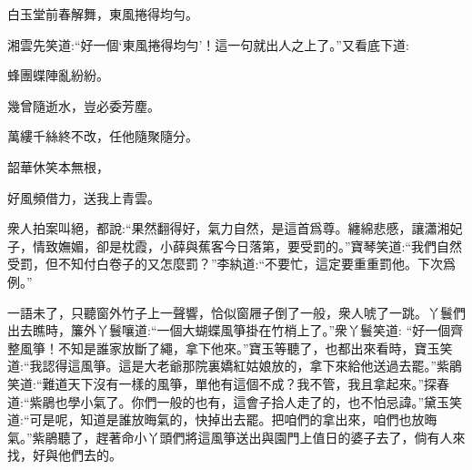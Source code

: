 \begin{poem}
    \begin{pl}白玉堂前春解舞，東風捲得均勻。\end{pl}
\end{poem}


\begin{parag}
    湘雲先笑道:“好一個‘東風捲得均勻’！這一句就出人之上了。”又看底下道:
\end{parag}


\begin{poem}
    \begin{pl}蜂團蝶陣亂紛紛。\end{pl}

    \begin{pl}幾曾隨逝水，豈必委芳塵。\end{pl}

    \begin{pl}萬縷千絲終不改，任他隨聚隨分。\end{pl}

    \begin{pl}韶華休笑本無根，\end{pl}

    \begin{pl}好風頻借力，送我上青雲。\end{pl}


\end{poem}


\begin{parag}
    衆人拍案叫絕，都說:“果然翻得好，氣力自然，是這首爲尊。纏綿悲慼，讓瀟湘妃子，情致嫵媚，卻是枕霞，小薛與蕉客今日落第，要受罰的。”寶琴笑道:“我們自然受罰，但不知付白卷子的又怎麼罰？”李紈道:“不要忙，這定要重重罰他。下次爲例。”
\end{parag}


\begin{parag}
    一語未了，只聽窗外竹子上一聲響，恰似窗屜子倒了一般，衆人唬了一跳。丫鬟們出去瞧時，簾外丫鬟嚷道:“一個大蝴蝶風箏掛在竹梢上了。”衆丫鬟笑道: “好一個齊整風箏！不知是誰家放斷了繩，拿下他來。”寶玉等聽了，也都出來看時，寶玉笑道:“我認得這風箏。這是大老爺那院裏嬌紅姑娘放的，拿下來給他送過去罷。”紫鵑笑道:“難道天下沒有一樣的風箏，單他有這個不成？我不管，我且拿起來。”探春道:“紫鵑也學小氣了。你們一般的也有，這會子拾人走了的，也不怕忌諱。”黛玉笑道:“可是呢，知道是誰放晦氣的，快掉出去罷。把咱們的拿出來，咱們也放晦氣。”紫鵑聽了，趕著命小丫頭們將這風箏送出與園門上值日的婆子去了，倘有人來找，好與他們去的。
\end{parag}


